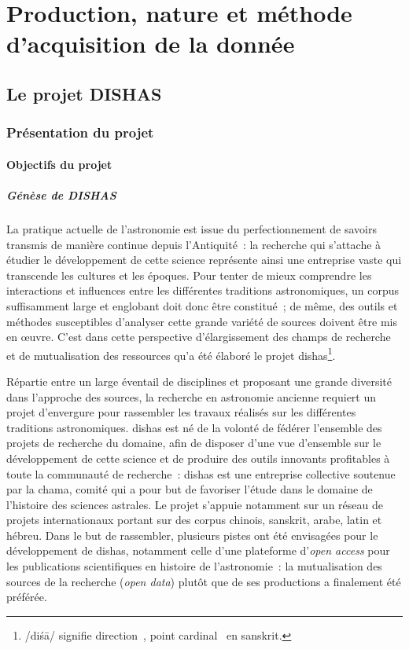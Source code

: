 \documentclass[a4paper,12pt,twoside]{book}
\newcommand{\eng}{\emph}
\newcommand{\g}[1]{\og#1~\fg}
\newcommand{\dishas}{\gls{dishas}\xspace}
\newcommand{\chama}{\gls{chama}\xspace}
\begin{document}
\thispagestyle{empty}
\cleardoublepage

\mainmatter

\part{Production, nature et méthode d'acquisition de la donnée}

\chapter{Le projet DISHAS}
	\section{Présentation du projet}
		\subsection{Objectifs du projet}
			\subsubsection{Génèse de DISHAS}
La pratique actuelle de l'astronomie est issue du perfectionnement de savoirs transmis de manière continue depuis l'Antiquité~: la recherche qui s'attache à étudier le développement de cette science représente ainsi une entreprise vaste qui transcende les cultures et les époques. Pour tenter de mieux comprendre les interactions et influences entre les différentes traditions astronomiques, un corpus suffisamment large et englobant doit donc être constitué~; de même, des outils et méthodes susceptibles d'analyser cette grande variété de sources doivent être mis en œuvre. C'est dans cette perspective d'élargissement des champs de recherche et de mutualisation des ressources qu'a été élaboré le projet \dishas\footnote{/diśā/ signifie \g{direction}, \g{point cardinal} en sanskrit.}.

Répartie entre un large éventail de disciplines et proposant une grande diversité dans l'approche des sources, la recherche en astronomie ancienne requiert un projet d'envergure pour rassembler les travaux réalisés sur les différentes traditions astronomiques. \dishas est né de la volonté de fédérer l'ensemble des projets de recherche du domaine, afin de disposer d'une vue d'ensemble sur le développement de cette science et de produire des outils innovants profitables à toute la communauté de recherche~: \dishas est une entreprise collective soutenue par la \chama, comité qui a pour but de favoriser l'étude dans le domaine de l'histoire des sciences astrales. Le projet s'appuie notamment sur un réseau de projets internationaux portant sur des corpus chinois, sanskrit, arabe, latin et hébreu. Dans le but de rassembler, plusieurs pistes ont été envisagées pour le développement de \dishas, notamment celle d'une plateforme d'\eng{open access} pour les publications scientifiques en histoire de l'astronomie~: la mutualisation des sources de la recherche (\eng{open data}) plutôt que de ses productions a finalement été préférée.
\end{document}
